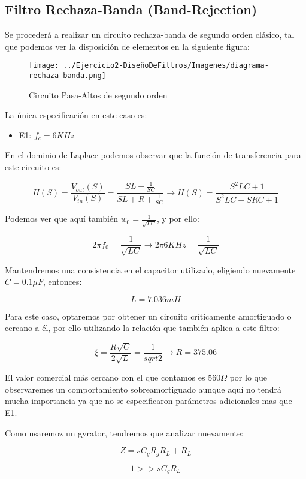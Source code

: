 \subsection{Filtro Rechaza-Banda (Band-Rejection)}

Se procederá a realizar un circuito rechaza-banda de segundo orden clásico, tal que podemos
ver la disposición de elementos en la siguiente figura:

\begin{figure}[H]
    \centering
    \texttt{[image: ../Ejercicio2-DiseñoDeFiltros/Imagenes/diagrama-rechaza-banda.png]}
    \caption{Circuito Pasa-Altos de segundo orden}
\end{figure}

La única especificación en este caso es:

\begin{itemize}
	\item E1: $f_c=6 KHz$
\end{itemize}

En el dominio de Laplace podemos observar que la función de transferencia para este circuito es:

$$H(S)=\frac{V_{out}(S)}{V_{in}(S)}=\frac{SL+\frac{1}{SC}}{SL+R+\frac{1}{SC}} \longrightarrow H(S)=\frac{S^{2}LC+1}{S^2LC+SRC+1}$$

Podemos ver que aquí también $w_0=\frac{1}{\sqrt{LC}}$, y por ello:

$$2 \pi f_0 = \frac{1}{\sqrt{LC}} \longrightarrow 2 \pi 6KHz = \frac{1}{\sqrt{LC}}$$

Mantendremos una consistencia en el capacitor utilizado, eligiendo nuevamente $C=0.1 \mu F$, entonces:

$$L = 7.036 mH$$

Para este caso, optaremos por obtener un circuito críticamente amortiguado o cercano a él, por ello utilizando la relación que también aplica a este
filtro:

$$\xi=\frac{R \sqrt{C}}{2\sqrt{L}}=\frac{1}{sqrt{2}} \longrightarrow R=375.06$$

El valor comercial más cercano con el que contamos es $560 \Omega$ por lo que observaremes un comportamiento sobreamortiguado aunque aquí
no tendrá mucha importancia ya que no se especificaron parámetros adicionales mas que E1.

Como usaremoz un gyrator, tendremos que analizar nuevamente:

$$Z=sC_gR_gR_L+R_L$$

$$1 >> sC_gR_L$$

